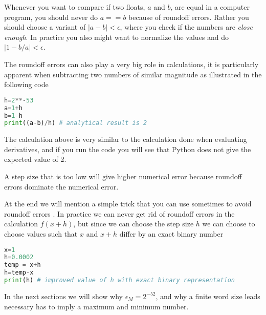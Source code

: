 \documentclass[graybox,sectrefs,envcountresetchap,open=right,final]{svmonodo}
\newenvironment{graybox2admon}[1][]{
\begin{graybox2mdframed}[frametitle=#1]
}
{
\end{graybox2mdframed}
}
\begin{document}
\begin{graybox2admon}[Comparing two floats]
Whenever you want to compare if two floats, $a$ and $b$, are equal in a computer program, you should never do $a==b$ because of roundoff errors. Rather you should choose a variant of $|a-b|<\epsilon$, where you check if the numbers are \emph{close enough}. In practice you also might want to normalize the values and do $|1-b/a|<\epsilon$.
\end{graybox2admon}



The roundoff errors can also play a very big role in calculations, it is particularly apparent when subtracting two numbers of similar magnitude as illustrated in the following code





\begin{lstlisting}[language=python,style=blue1bar]
h=2**-53
a=1+h
b=1-h
print((a-b)/h) # analytical result is 2

\end{lstlisting}

The calculation above is very similar to the calculation done when evaluating derivatives, and if you run the code you will see that Python does not give the expected value of 2.


\begin{graybox2admon}[Choosing the right step size]
A step size that is too low will give higher numerical error because roundoff errors dominate the numerical error.
\end{graybox2admon}



At the end we will mention a simple trick that you can use sometimes to avoid roundoff errors \cite{flannery1992numerical}. In practice we can never get rid of roundoff errors in the calculation $f(x+h)$, but since we can choose the step size $h$ we can choose to choose values such that $x$ and $x+h$ differ by an exact binary number






\begin{lstlisting}[language=python,style=blue1bar]
x=1
h=0.0002 
temp = x+h
h=temp-x
print(h) # improved value of h with exact binary representation

\end{lstlisting}

In the next sections we will show why $\epsilon_M=2^{-52}$, and why a finite word size leads necessary has to imply a maximum and minimum number.  
\end{document}
